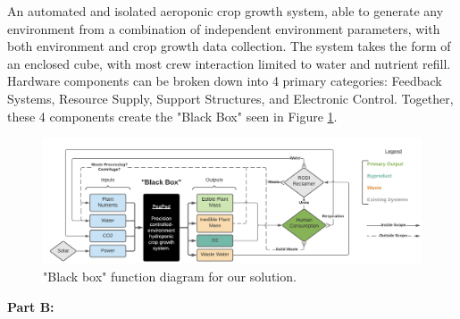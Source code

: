 \documentclass{report}
\begin{document}
An automated and isolated aeroponic crop growth system, able to generate any environment from a combination of independent environment parameters, with both environment and crop growth data collection.
The system takes the form of an enclosed cube, with most crew interaction limited to water and nutrient refill. Hardware components can be broken down into 4 primary categories: Feedback Systems, Resource Supply, Support Structures, and Electronic Control. 
Together, these 4 components create the "Black Box" seen in Figure \ref{fig:blackbox}.

\begin{figure}[h]
    \centering
    \includegraphics[width=15cm]{../solutionoverview/images/blackbox.png}
    \hfill
    \caption{"Black box" function diagram for our solution.}
    \label{fig:blackbox}
\end{figure}

\textbf{Part B:}
\label{sec:description-b}




\end{document}
